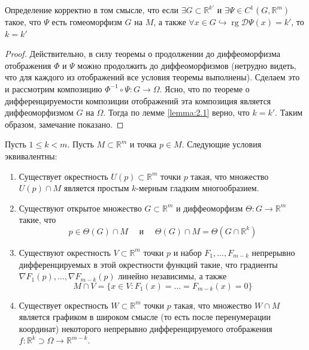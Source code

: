 \documentclass[11pt]{article}
\DeclareMathOperator{\rg}{rg}
\begin{document}
\begin{remark}
    Определение корректно в том смысле, что если $\exists G \subset \mathbb{R}^{k'}$
    и $\exists \Psi \in C^1(G, \mathbb{R}^m)$ такое, что $\Psi$ есть гомеоморфизм
    $G$ на $M$, а также $\forall x \in G \hookrightarrow \rg \mathcal{D}\Psi(x) = k'$, то $k = k'$
\end{remark}

\begin{proof}
    Действительно, в силу теоремы о продолжении до диффеоморфизма отображения $\Phi$ и $\Psi$
    можно продолжить до диффеоморфизмов (нетрудно видеть, что для каждого из отображений все условия теоремы выполнены). Сделаем это и рассмотрим композицию $\Phi^{-1} \circ \Psi \colon G \to \Omega$. Ясно, что по теореме о дифференцируемости композиции отображений эта композиция является диффеоморфизмом $G$ на $\Omega$. Тогда по лемме \ref{lemma:2.1} верно, что $k = k'$. Таким образом, замечание показано.
\end{proof}

\begin{theorem}
    Пусть $1 \leq k < m$. Пусть $M \subset \mathbb{R}^m$  и точка $p \in M$.
    Следующие условия эквивалентны:
    \begin{enumerate}
        \item Существует окрестность $U(p) \subset \mathbb{R}^m$ точки $p$ такая, что множество $U(p) \cap M$ является простым $k$-мерным гладким многообразием.
        \item Существуют открытое множество $G \subset \mathbb{R}^m$ и диффеоморфизм $\Theta \colon G \to \mathbb{R}^m$ такие, что 
        \[p \in \Theta(G) \cap M \quad \text{ и } \quad \Theta(G) \cap M = \Theta(G \cap \mathbb{R}^k)\]
        \item Существуют окрестность $V \subset \mathbb{R}^m$ точки $p$ и набор $F_1, \dots, F_{m-k}$ непрерывно 
        дифференцируемых в этой окрестности функций такие, что градиенты $\nabla F_1(p), \ldots, \nabla F_{m-k}(p)$ линейно независимы, а также
        \[M \cap V = \{x \in V: F_1(x) = \ldots = F_{m-k}(x) = 0\}\] 
        \item Существует окрестность $W \subset \mathbb{R}^m$ точки $p$ такая, что 
        множество $W \cap M$ является графиком в широком смысле (то есть после перенумерации координат)
        некоторого непрерывно дифференцируемого отображения $f \colon \mathbb{R}^k \supset \Omega \to \mathbb{R}^{m - k}$.
    \end{enumerate}
\end{theorem}
\end{document}
